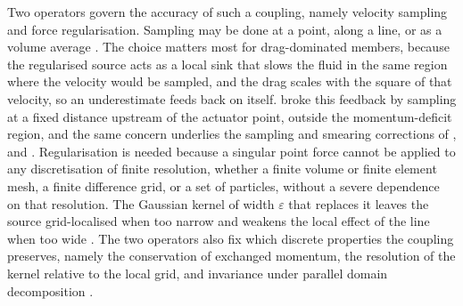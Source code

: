 \noindent
Two operators govern the accuracy of such a coupling, namely velocity sampling and force regularisation. Sampling may be done at a point, along a line, or as a volume average \citep{sorensen_numerical_2002,merabet_parametric_2019,zormpa_effect_2025}. The choice matters most for drag-dominated members, because the regularised source acts as a local sink that slows the fluid in the same region where the velocity would be sampled, and the drag scales with the square of that velocity, so an underestimate feeds back on itself. \citet{bral_development_2025} broke this feedback by sampling at a fixed distance upstream of the actuator point, outside the momentum-deficit region, and the same concern underlies the sampling and smearing corrections of \citet{churchfield_modeling_2015}, \citet{martinez_tossas_optimal_2017} and \citet{muscari_effective_2024}. Regularisation is needed because a singular point force cannot be applied to any discretisation of finite resolution, whether a finite volume or finite element mesh, a finite difference grid, or a set of particles, without a severe dependence on that resolution. The Gaussian kernel of width $\varepsilon$ that replaces it leaves the source grid-localised when too narrow and weakens the local effect of the line when too wide \citep{martinez_tossas_optimal_2017,navarro_diaz_actuator_2023}. The two operators also fix which discrete properties the coupling preserves, namely the conservation of exchanged momentum, the resolution of the kernel relative to the local grid, and invariance under parallel domain decomposition \citep{bral_development_2025}.

